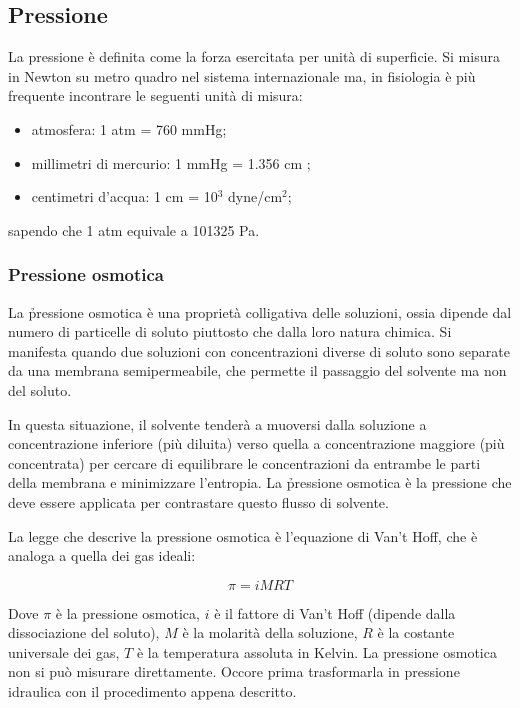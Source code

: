 \begin{description}
\end{description}

\subsection{Pressione}
La pressione è definita come la forza esercitata per unità di superficie. Si misura in Newton su metro quadro nel sistema internazionale ma, in fisiologia è più frequente incontrare le seguenti unità di misura:
\begin{itemize}
    \item atmosfera: 1 atm = 760 mmHg;
    \item millimetri di mercurio: 1 mmHg = 1.356 cm ;
    \item centimetri d'acqua: 1 cm  = 10$^3$ dyne/cm$^2$;
\end{itemize}
sapendo che 1 atm equivale a 101325 Pa.

\subsubsection{Pressione osmotica}
La \h{pressione osmotica} è una proprietà colligativa delle soluzioni, ossia dipende dal numero di particelle di soluto piuttosto che dalla loro natura chimica. Si manifesta quando due soluzioni con concentrazioni diverse di soluto sono separate da una membrana semipermeabile, che permette il passaggio del solvente ma non del soluto.

In questa situazione, il solvente tenderà a muoversi dalla soluzione a concentrazione inferiore (più diluita) verso quella a concentrazione maggiore (più concentrata) per cercare di equilibrare le concentrazioni da entrambe le parti della membrana e minimizzare l'entropia. La \h{pressione osmotica} è la pressione che deve essere applicata per contrastare questo flusso di solvente.

La legge che descrive la pressione osmotica è l'equazione di Van't Hoff, che è analoga a quella dei gas ideali:

\[
\pi = iMRT
\]

Dove \( \pi \) è la pressione osmotica, \( i \) è il fattore di Van't Hoff (dipende dalla dissociazione del soluto), \( M \) è la molarità della soluzione, \( R \) è la costante universale dei gas, \( T \) è la temperatura assoluta in Kelvin. La pressione osmotica non si può misurare direttamente. Occore prima trasformarla in pressione idraulica con il procedimento appena descritto.


